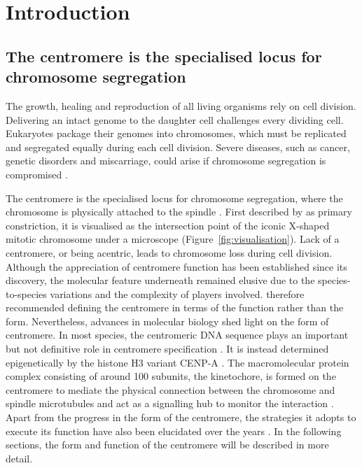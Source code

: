 \chapter{Introduction}
\section{The centromere is the specialised locus for chromosome segregation}

 The growth, healing and reproduction of all living organisms rely on cell division. Delivering an intact genome to the daughter cell challenges every dividing cell. Eukaryotes package their genomes into chromosomes, which must be replicated and segregated equally during each cell division. Severe diseases, such as cancer, genetic disorders and miscarriage, could arise if chromosome segregation is compromised \citep{Jallepalli2001ChromosomeMystery, Draviam2004ChromosomeStability, Wasielak-Politowska2022ChromosomeAging, Losada2014CohesinBeyond}. 
 
 The centromere is the specialised locus for chromosome segregation, where the chromosome is physically attached to the spindle \citep{Westhorpe2015AMaintenance, McKinley2015TheFunction, Talbert2020WhatCentromere, Fukagawa2014}. First described by \cite{Flemming1882ZellsubstanzZelltheilung} as primary constriction, it is visualised as the intersection point of the iconic X-shaped mitotic chromosome under a microscope (Figure~\ref{fig:visualisation}). Lack of a centromere, or being acentric, leads to chromosome loss during cell division. Although the appreciation of centromere function has been established since its discovery, the molecular feature underneath remained elusive due to the species-to-species variations and the complexity of players involved. \cite{Darlington1936TheEnquiry} therefore recommended defining the centromere in terms of the function rather than the form. Nevertheless, advances in molecular biology shed light on the form of centromere. In most species, the centromeric DNA sequence plays an important but not definitive role in centromere specification \citep{Hoffmann2020, Harrington1997FormationMicrochromosomes, Catania2015SequenceChromatin, Iwata-Otsubo2017, Kasinathan2018Non-B-FormCentromeres, Shukla2018CentromereCycle, Logsdon2019, Murillo-Pineda2020}. It is instead determined epigenetically by the histone H3 variant CENP-A \citep{Warburton1997ImmunolocalizationCentromeres, Vafa1997ChromatinPlate, Earnshaw1985ThreeChromosome, Liu2006MappingCells, Regnier2005CENP-ABubR1, Heun2006, Mendiburo2011, Barnhart2011, Logsdon2015}. The macromolecular protein complex consisting of around 100 subunits, the kinetochore, is formed on the centromere to mediate the physical connection between the chromosome and spindle microtubules and act as a signalling hub to monitor the interaction \citep{Musacchio2017AFunction, McAinsh2022TheKinetochores, Cheeseman2014TheKinetochore, Hara2018KinetochoreExit}. Apart from the progress in the form of the centromere, the strategies it adopts to execute its function have also been elucidated over the years \citep{Tanaka2013, Zhou2020EmergentChromosomes}. In the following sections, the form and function of the centromere will be described in more detail. 

